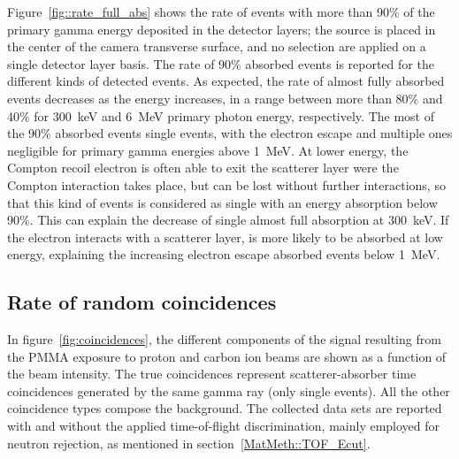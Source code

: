 Figure~\ref{fig::rate_full_abs} shows the rate of events with more than 90\% of the primary gamma energy deposited in the detector layers; the source is placed in the center of the camera transverse surface, and no selection are applied on a single detector layer basis. The rate of 90\% absorbed events is reported for the different kinds of detected events. As expected, the rate of almost fully absorbed events decreases as the energy increases, in a range between more than 80\% and 40\% for 300~keV and 6~MeV primary photon energy, respectively. The most of the 90\% absorbed events single events, with the electron escape and multiple ones negligible for primary gamma energies above 1~MeV. At lower energy, the Compton recoil electron is often able to exit the scatterer layer were the Compton interaction takes place, but can be lost without further interactions, so that this kind of events is considered as single with an energy absorption below 90\%. This can explain the decrease of single almost full absorption at 300~keV. If the electron interacts with a scatterer layer, is more likely to be absorbed at low energy, explaining the increasing electron escape absorbed events below 1~MeV.  
 
\subsection{Rate of random coincidences}
\label{Results::beamInt}
 
In figure~\ref{fig:coincidences}, the different components of the signal resulting from the PMMA exposure to proton and carbon ion beams are shown as a function of the beam intensity. The true coincidences represent scatterer-absorber time coincidences generated by the same gamma ray (only single events). All the other coincidence types compose the background. The collected data sets are reported with and without the applied time-of-flight discrimination, mainly employed for neutron rejection, as mentioned in section~\ref{MatMeth::TOF_Ecut}.



